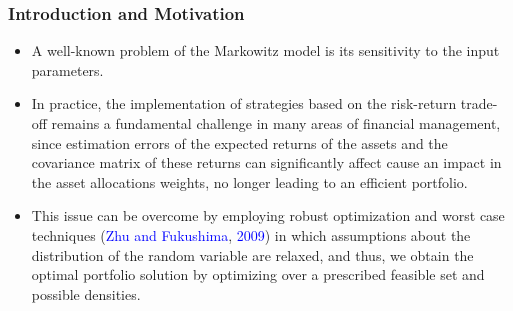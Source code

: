\documentclass[pdf,10pt,xcolor=dvipsnames,hide notes]{beamer}
\begin{document}
\begin{frame}[label=frame1d]
	\frametitle{Introduction and Motivation}
	
	\begin{itemize}
		\justifying
		
		
		\vspace{0.3cm}
		
		\item A well-known problem of
		the Markowitz model is its sensitivity to the input parameters. 
		
		\vspace{0.3cm}
		
		
		\item In practice, the implementation of strategies based on the risk-return trade-off remains a fundamental challenge in many areas of financial management, since estimation errors of the expected returns of the assets and the covariance
		matrix of these returns can significantly affect cause an impact in the asset allocations weights, no
		longer leading to an efficient portfolio.
		
		
	
		\vspace{0.3cm}
		
	\item This issue can be overcome by employing robust optimization and
	worst case techniques (\textcolor{blue}{Zhu and Fukushima}, \textcolor{blue}{2009}) in which assumptions about the
	distribution of the random variable are relaxed, and thus, we obtain the
	optimal portfolio solution by optimizing over a prescribed feasible set and
	possible densities.
		
	\end{itemize}
	
	
\end{frame}
\end{document}
